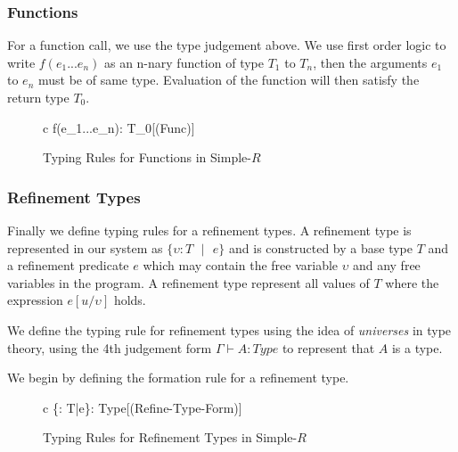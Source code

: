 \documentclass[a4paper,12pt]{report}
\begin{document}
\subsubsection{Functions}
For a function call, we use the type judgement above. We use  
first order logic to write $f(e_1...e_n)$ as an n-nary function of 
type $T_1$ to $T_n$, then the arguments $e_1$ to $e_n$ must be of same type. 
Evaluation of the function will then satisfy the return type $T_0$.

\begin{figure}[H]
  \begin{center}
    \begin{tabular} {c}
        {\Gamma \vdash f(e_1...e_n): T_0}[(Func)]
    \end{tabular}
  \end{center}
  \caption{Typing Rules for Functions in Simple-$R$}
\end{figure}

\subsubsection{Refinement Types} \label{section:ref_type_check}
Finally we define typing rules for a refinement types. A refinement type 
is represented in our system as $\{\upsilon : T\text{ }|\text{ }e\}$ and is 
constructed by a base type $T$ and a refinement predicate $e$ which may contain 
the free variable $\upsilon$ and any free variables in the program. A refinement 
type represent all values of $T$ where the expression $e[u/\upsilon]$ holds. 

\par
We define the typing rule for refinement types using the idea of 
\textit{universes} \cite{martinLof} in type theory, using the 4th judgement form 
$\Gamma \vdash A : Type$ to represent that $A$ is a type. 

\par
We begin by defining the formation rule for a refinement type. 
\begin{figure}[H]
  \begin{center}
    \begin{tabular} {c}
        {\Gamma \vdash \{\upsilon : T\text{ }|\text{ }e\}: Type}[(Refine-Type-Form)]
    \end{tabular}
  \end{center}
  \caption{Typing Rules for Refinement Types in Simple-$R$}
\end{figure}
\end{document}

